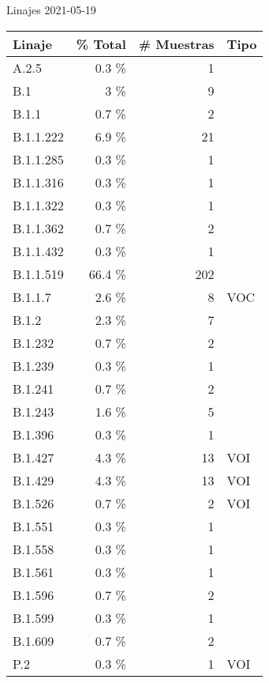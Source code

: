 \documentclass[12pt]{standalone}
\begin{document}
\bigskip
\centering
Linajes 2021-05-19
\begin{table}[ht]
\centering
\begin{tabular}{lrrl}
  \toprule
{\textbf{Linaje}} & {\textbf{\% Total}} & {\textbf{\# Muestras}} & {\textbf{Tipo}} \\ 
  \midrule
A.2.5 & 0.3 \% &   1 &  \\ 
  B.1 & 3 \% &   9 &  \\ 
  B.1.1 & 0.7 \% &   2 &  \\ 
  B.1.1.222 & 6.9 \% &  21 &  \\ 
  B.1.1.285 & 0.3 \% &   1 &  \\ 
  B.1.1.316 & 0.3 \% &   1 &  \\ 
  B.1.1.322 & 0.3 \% &   1 &  \\ 
  B.1.1.362 & 0.7 \% &   2 &  \\ 
  B.1.1.432 & 0.3 \% &   1 &  \\ 
  B.1.1.519 & 66.4 \% & 202 &  \\ 
  B.1.1.7 & 2.6 \% &   8 & VOC \\ 
  B.1.2 & 2.3 \% &   7 &  \\ 
  B.1.232 & 0.7 \% &   2 &  \\ 
  B.1.239 & 0.3 \% &   1 &  \\ 
  B.1.241 & 0.7 \% &   2 &  \\ 
  B.1.243 & 1.6 \% &   5 &  \\ 
  B.1.396 & 0.3 \% &   1 &  \\ 
  B.1.427 & 4.3 \% &  13 & VOI \\ 
  B.1.429 & 4.3 \% &  13 & VOI \\ 
  B.1.526 & 0.7 \% &   2 & VOI \\ 
  B.1.551 & 0.3 \% &   1 &  \\ 
  B.1.558 & 0.3 \% &   1 &  \\ 
  B.1.561 & 0.3 \% &   1 &  \\ 
  B.1.596 & 0.7 \% &   2 &  \\ 
  B.1.599 & 0.3 \% &   1 &  \\ 
  B.1.609 & 0.7 \% &   2 &  \\ 
  P.2 & 0.3 \% &   1 & VOI \\ 
   \bottomrule
\end{tabular}
\end{table}

\bigskip
\endminipage
\end{document}
